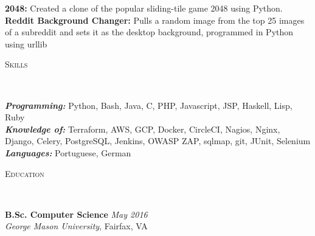 \documentclass[9pt]{article}
\newenvironment{changemargin}[2]{%
  \begin{list}{}{%
    \setlength{\topsep}{0pt}%
    \setlength{\leftmargin}{#1}%
    \setlength{\rightmargin}{#2}%
    \setlength{\listparindent}{\parindent}%
    \setlength{\itemindent}{\parindent}%
    \setlength{\parsep}{\parskip}%
  }%
  \item[]}{\end{list}
}
\newcommand{\lineover}{
	\begin{changemargin}{-0.05in}{-0.05in}
		\vspace*{-8pt}
		\hrulefill \\
		\vspace*{-2pt}
	\end{changemargin}
}
\newcommand{\header}[1]{
	\begin{changemargin}{-0.5in}{-0.5in}
		\scshape{#1}\\
  	\lineover
	\end{changemargin}
}
\newenvironment{body} {
	\vspace*{-10pt}
	\begin{changemargin}{-0.25in}{-0.5in}
  }	
	{\end{changemargin}
}
\begin{document}
\begin{body}
	\vspace{14pt}
	{\textbf{2048:}}{} Created a clone of the popular sliding-tile game 2048 using Python.\\
	\vspace{4pt}
	{\textbf{Reddit Background Changer:}}{} Pulls a random image from the top 25 images of a subreddit and sets it as the desktop background, programmed in Python using urllib\\
	\vspace{14pt}
\end{body}

\header{Skills}

\begin{body}
	\vspace{14pt}
	\emph{\textbf{Programming:}}{} Python, Bash, Java, C, PHP, Javascript, JSP, Haskell, Lisp, Ruby\\
	\smallskip
	\emph{\textbf{Knowledge of:}}{} Terraform, AWS, GCP, Docker, CircleCI, Nagios, Nginx, Django, Celery, PostgreSQL, Jenkins, OWASP ZAP, sqlmap, git, JUnit, Selenium\\
	\smallskip
	\emph{\textbf{Languages:}}{} Portuguese, German\\
\end{body}
\vspace{14pt}
\header{Education}

\begin{body}
	\vspace{14pt}
	\textbf{B.Sc. Computer Science }{} \hfill \emph{May 2016}{}\\
	\emph{George Mason University}, Fairfax, VA\\
	\vspace{4pt}
\end{body}
\smallskip
\end{document}
